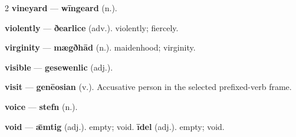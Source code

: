 \begin{multicols}{2}
\textbf{vineyard} — \textbf{wīngeard} (n.).\par
\textbf{violently} — \textbf{ðearlice} (adv.). violently; fiercely.\par
\textbf{virginity} — \textbf{mægðhād} (n.). maidenhood; virginity.\par
\textbf{visible} — \textbf{gesewenlic} (adj.).\par
\textbf{visit} — \textbf{genēosian} (v.). Accusative person in the selected prefixed-verb frame.\par
\textbf{voice} — \textbf{stefn} (n.).\par
\textbf{void} — \textbf{ǣmtig} (adj.). empty; void. \textbf{īdel} (adj.). empty; void.\par

\end{multicols}
